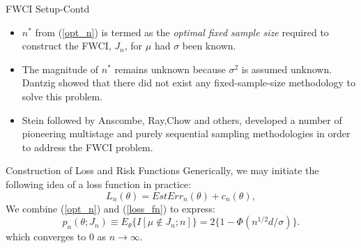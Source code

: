 \documentclass [xcolor=svgnames, t] {beamer}
\begin{document}
 \begin{frame}{FWCI Setup-Contd}
  \vspace{5mm}

\begin{itemize}
\item $n^*$ from (\ref{opt_n}) is termed as the \textit{optimal fixed sample size} required to 
construct the FWCI, $J_n$, for $\mu$ had $\sigma$ been known.
\item The magnitude of $n^*$ remains unknown because $\sigma^2$ is 
assumed unknown. Dantzig\cite{dantzig1940} showed that there 
did not exist any fixed-sample-size methodology to solve this problem.
\item Stein\cite{stein1945}\cite{stein1949} followed by Anscombe\cite{anscombe1952}\cite{anscombe1953}, Ray\cite{ray1957},Chow\cite{chow1965} and
others, developed a number of pioneering multistage and purely sequential sampling
methodologies in order to address the FWCI problem.
\end{itemize}


\end{frame}
\begin{frame}{Construction of Loss and Risk Functions}
    \vspace{5mm}
    Generically, we may initiate the following idea of a loss function in practice:
        \begin{equation} \label{loss_fn}
            L_n(\theta)  = EstErr_n(\theta)+c_n(\theta),
        \end{equation}
        \vspace{2mm}
    We combine (\ref{opt_n}) and (\ref{loss_fn}) to express:
        \begin{equation} \label{p_n_theta}
        p_n(\theta ;J_n) \equiv E_{\theta} \{ {I[ \mu \not\in J_n;n]}\} =2\{ 1-\Phi(n^{1/2}d/\sigma) \}.
        \end{equation}
        which converges to $0$ as $n \rightarrow \infty$.\\
        \vspace{0.1cm}
                
\end{frame}
\end{document}
